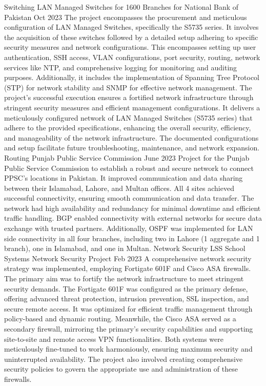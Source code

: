 \documentclass[9pt]{developercv} %
\begin{document}
\begin{entrylist}
    \entry
		{Switching}
		{LAN Managed Switches for 1600 Branches for National Bank of Pakistan}
		{Oct 2023}
		{%
        The project encompasses the procurement and meticulous configuration of LAN Managed Switches, specifically the S5735 series. It involves the acquisition of these switches followed by a detailed setup adhering to specific security measures and network configurations. This encompasses setting up user authentication, SSH access, VLAN configurations, port security, routing, network services like NTP, and comprehensive logging for monitoring and auditing purposes. Additionally, it includes the implementation of Spanning Tree Protocol (STP) for network stability and SNMP for effective network management. The project's successful execution ensures a fortified network infrastructure through stringent security measures and efficient management configurations. It delivers a meticulously configured network of LAN Managed Switches (S5735 series) that adhere to the provided specifications, enhancing the overall security, efficiency, and manageability of the network infrastructure. The documented configurations and setup facilitate future troubleshooting, maintenance, and network expansion.}
    \entry
		{Routing}
		{Punjab Public Service Commission}
		{June 2023}
		{%
        Project for the Punjab Public Service Commission to establish a robust and secure network to connect PPSC's locations in Pakistan. It improved communication and data sharing between their Islamabad, Lahore, and Multan offices. All 4 sites achieved successful connectivity, ensuring smooth communication and data transfer. The network had high availability and redundancy for minimal downtime and efficient traffic handling. BGP enabled connectivity with external networks for secure data exchange with trusted partners. Additionally, OSPF was implemented for LAN side connectivity in all four branches, including two in Lahore (1 aggregate and 1 branch), one in Islamabad, and one in Multan.}
	\entry
		{Network Security}
		{LSS School Systems Network Security Project}
		{Feb 2023}
		{%
        A comprehensive network security strategy was implemented, employing Fortigate 601F and Cisco ASA firewalls. The primary aim was to fortify the network infrastructure to meet stringent security demands. The Fortigate 601F was configured as the primary defense, offering advanced threat protection, intrusion prevention, SSL inspection, and secure remote access. It was optimized for efficient traffic management through policy-based and dynamic routing. Meanwhile, the Cisco ASA served as a secondary firewall, mirroring the primary's security capabilities and supporting site-to-site and remote access VPN functionalities. Both systems were meticulously fine-tuned to work harmoniously, ensuring maximum security and uninterrupted availability. The project also involved creating comprehensive security policies to govern the appropriate use and administration of these firewalls.}

\end{entrylist}
\end{document}
